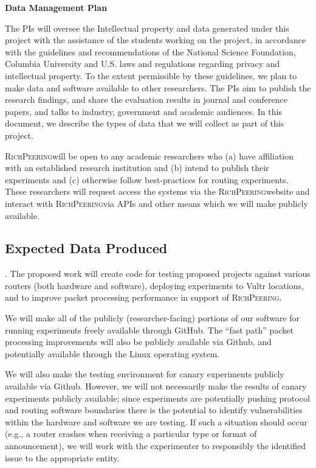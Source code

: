 \documentclass[11pt]{article}
\newcommand{\sys}{{\textsc{RichPeering}\xspace}}
\newcommand{\parai}[1]{\smallskip\noindent{\textit {#1}}}
\begin{document}
\begin{center}
{\LARGE \textbf{Data Management Plan}}
\end{center}

\bigskip
\par

The PIs will oversee the Intellectual property and data generated under this project with the assistance of the students working on the project, in accordance with the guidelines and recommendations of the National Science Foundation, Columbia University and U.S. laws and regulations regarding privacy and intellectual property.
To the extent permissible by these guidelines, we plan to make data and software available to other researchers. The PIs aim to publish the research findings, and share the evaluation results in journal and conference papers, and talks to industry, government and academic audiences. In this document, we describe the types of data that we will collect as part of this project. 

\sys will be open to any academic researchers  who (a) have affiliation with an established research institution and (b) intend to publish their experiments and (c) otherwise follow best-practices for routing experiments. These researchers will request access the systems via the \sys website and interact with \sys via APIs and other means which we will make publicly available.  

\subsection*{Expected Data Produced}


\parai{Software and code}.  The proposed work will create code for testing proposed projects against various routers (both hardware and software), deploying experiments to Vultr locations, and to improve packet processing performance in support of \sys.  

We will make all of the  publicly (researcher-facing) portions of our software for running experiments freely available through GitHub.  The ``fast path'' packet processing improvements will also be publicly available via Github, and potentially available through the Linux operating system.

We will also make the testing environment for canary experiments publicly available via Github.  However, we will not necessarily make the results of canary experiments publicly available; since experiments are potentially pushing protocol and routing software boundaries there is the potential to identify vulnerabilities within the hardware and software we are testing.  If such a situation should occur (e.g., a router crashes when receiving a particular type or format of announcement), we will work with the experimenter to responsibly the identified issue to the appropriate entity.
\end{document}
